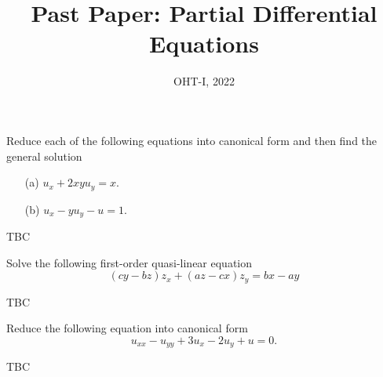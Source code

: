 \documentclass[11pt]{penrose}
\title{Past Paper: Partial Differential Equations}
\subtitle{OHT-I, 2022}
\begin{document}
\maketitle
\warningtext

\begin{problem}{1}
    Reduce each of the following equations into canonical form and then find the general solution
    \begin{enumerate}
        \item[(a)] $u_x + 2xy u_y = x$.
        \item[(b)] $u_x - y u_y - u = 1$.
    \end{enumerate}
    
    \solution TBC
\end{problem}

\begin{problem}{2}
    Solve the following first-order quasi-linear equation
    \begin{equation*}
        (cy-bz) z_x + (az-cx) z_y = bx-ay
    \end{equation*}
    
    \solution TBC
\end{problem}

\begin{problem}{3}
    Reduce the following equation into canonical form
    \begin{equation*}
        u_{xx} - u_{yy} + 3u_{x} - 2u_{y} + u = 0.
    \end{equation*}
    
    \solution TBC
\end{problem}
\end{document}
